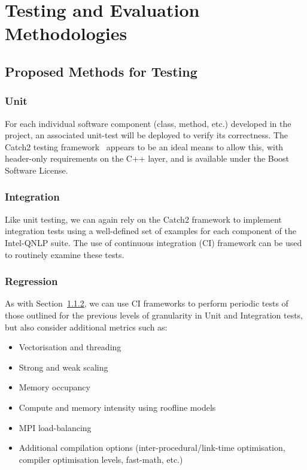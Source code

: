 \section{Testing and Evaluation Methodologies}
\label{sec:testing_and_evaluation_methodologies}

\subsection{Proposed Methods for Testing}
\label{sec:proposed_methods_for_testing}

\subsubsection{Unit}\label{ss:unit}
For each individual software component (class, method, etc.) developed in the project, an associated unit-test will be deployed to verify its correctness. The Catch2 testing framework~\cite{catch2} appears to be an ideal means to allow this, with header-only requirements on the C++ layer, and is available under the Boost Software License.

\subsubsection{Integration}\label{ss:integration}
Like unit testing, we can again rely on the Catch2 framework to implement integration tests using a well-defined set of examples for each component of the Intel-QNLP suite. The use of continuous integration (CI) framework can be used to routinely examine these tests.


\subsubsection{Regression}\label{ss:regression}
As with Section~\ref{ss:integration}, we can use CI frameworks to perform periodic tests of those outlined for the previous levels of granularity in Unit and Integration tests, but also consider additional metrics such as:
\begin{itemize}
    \item Vectorisation and threading
    \item Strong and weak scaling
    \item Memory occupancy
    \item Compute and memory intensity using roofline models
    \item MPI load-balancing
    \item Additional compilation options (inter-procedural/link-time optimisation, compiler optimisation levels, fast-math, etc.) 
\end{itemize}

